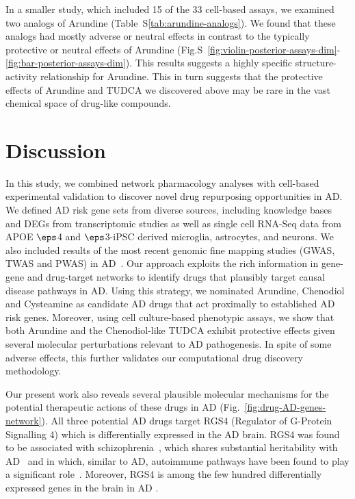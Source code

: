 \documentclass[letterpaper]{article}
\begin{document}
In a smaller study, which included 15 of the 33 cell-based assays, we examined
two analogs of Arundine (Table~S\ref{tab:arundine-analogs}).  We found that
these analogs had mostly adverse or neutral effects in contrast to the
typically protective or neutral effects of Arundine
(Fig.S~\ref{fig:violin-posterior-assays-dim}-\ref{fig:bar-posterior-assays-dim}).
This results suggests a highly specific structure-activity relationship for
Arundine. This in turn suggests that the protective effects of Arundine and
TUDCA we discovered above may be rare in the vast chemical space of
drug-like compounds.

\section{Discussion}

In this study, we combined network pharmacology analyses with cell-based
experimental validation to discover novel drug
repurposing opportunities in AD. We defined AD risk gene sets from diverse
sources, including knowledge bases and DEGs from transcriptomic studies as
well as single cell RNA-Seq data from APOE $\eps$4 and $\eps$3-iPSC derived
microglia, astrocytes, and neurons. We also included results of the most
recent genomic fine mapping studies (GWAS, TWAS and PWAS) in
AD~\citep{Zhu2018,Lau2020}. Our approach exploits the rich information in
gene-gene and drug-target networks to identify drugs that plausibly target
causal disease pathways in AD. Using this strategy, we nominated Arundine,
Chenodiol and Cysteamine as candidate AD drugs that act proximally to
established AD risk genes. Moreover, using cell culture-based phenotypic assays,
we show that both Arundine and the Chenodiol-like TUDCA exhibit protective
effects given several molecular perturbations relevant to AD pathogenesis.  In
spite of some adverse effects, this further validates our computational drug
discovery methodology.

Our present work
also reveals several plausible molecular mechanisms for the potential
therapeutic actions of these drugs in AD
(Fig.~\ref{fig:drug-AD-genes-network}).  All three potential AD drugs target
RGS4 (Regulator of G-Protein Signalling 4) which is differentially expressed
in the AD brain.  RGS4 was found to be associated
with schizophrenia~\citep{Chowdari2002}, which shares substantial
heritability with AD~\citep{Consortium2018} and in which, similar to AD,
autoimmune pathways have been found to play a significant
role~\citep{Sekar2016a}.  Moreover, RGS4 is among the few hundred
differentially expressed genes in the brain in AD
\cite{Taubes2021}.
\end{document}
